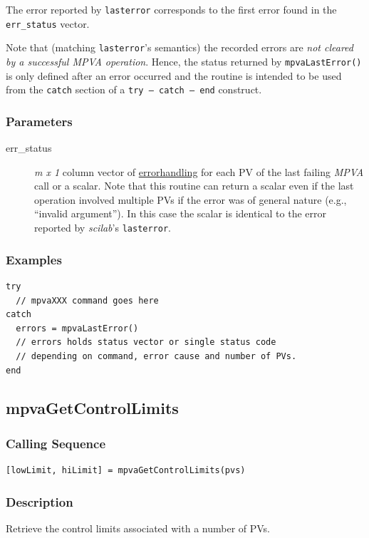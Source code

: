 \documentclass{article}
\newcommand{\sca}{\ita{MPVA}}
\newcommand{\scilab}{\ita{scilab}}
\newcommand{\com}[1]{{\tt #1}}
\newcommand{\pbrkf}{\pagebreak}
\newcommand{\ita}[1]{\emph{#1}}
\newcommand{\mxl}{$m\times 1$}
\renewcommand{\mxl}{\ita{m x 1}}
\renewcommand{\pbrkf}{}
\begin{document}
The error reported by \com{lasterror} corresponds to the first error
found in the \com{err\_status} vector.

Note that (matching \com{lasterror}'s semantics) the recorded
errors are {\it not cleared by a successful \sca{} operation}.
Hence, the status returned by \com{mpvaLastError()} is only defined
after an error occurred and the routine is intended to be used
from the \com{catch} section of a \mbox{\com{try -- catch -- end}}
construct.

\subsubsection{Parameters}
\begin{description}
\item[err\_status] \mxl{} column vector of
\hyperref{status codes}{(see~}{)}{errorhandling}
for each PV of the last failing \sca{} call or a scalar.
Note that this routine can return a scalar even if
the last operation involved multiple PVs if the
error was of general nature (e.g., ``invalid argument'').
In this case the scalar is identical to the error reported
by \scilab{}'s \com{lasterror}.
\end{description}
\subsubsection{Examples}
\begin{verbatim}
try
  // mpvaXXX command goes here
catch
  errors = mpvaLastError()
  // errors holds status vector or single status code
  // depending on command, error cause and number of PVs.
end
\end{verbatim}

\vspace*{\fill}
\pbrkf
\subsection{mpvaGetControlLimits}
\subsubsection{Calling Sequence}
\begin{verbatim}
[lowLimit, hiLimit] = mpvaGetControlLimits(pvs)
\end{verbatim}
\subsubsection{Description}
Retrieve the control limits associated with a number of PVs.
\end{document}
